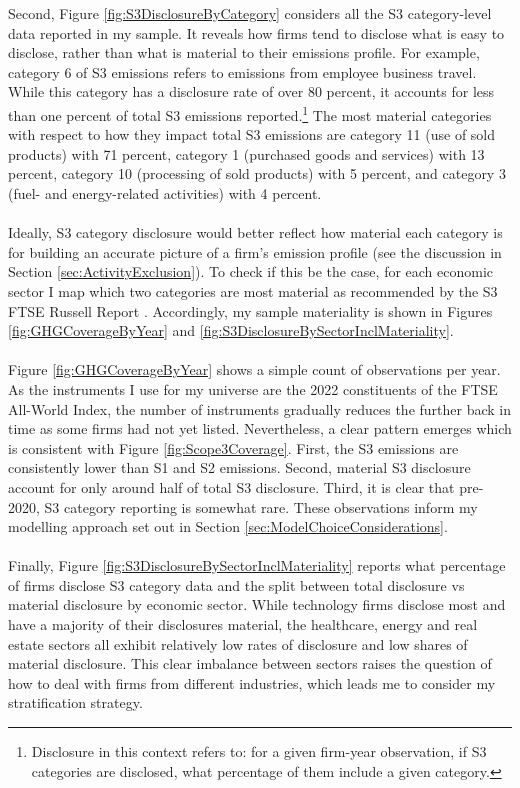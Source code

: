 \documentclass[12pt,twoside]{report}
\begin{document}
Second, Figure \ref{fig:S3DisclosureByCategory} considers all the S3 category-level data reported in my sample. It reveals how firms tend to disclose what is easy to disclose, rather than what is material to their emissions profile. For example, category 6 of S3 emissions refers to emissions from employee business travel. While this category has a disclosure rate of over 80 percent, it accounts for less than one percent of total S3 emissions reported.\footnote{Disclosure in this context refers to: for a given firm-year observation, if S3 categories are disclosed, what percentage of them include a given category.} The most material categories with respect to how they impact total S3 emissions are category 11 (use of sold products) with 71 percent, category 1 (purchased goods and services) with 13 percent, category 10 (processing of sold products) with 5 percent, and category 3 (fuel- and energy-related activities) with 4 percent. 
\\\\
Ideally, S3 category disclosure would better reflect how material each category is for building an accurate picture of a firm's emission profile (see the discussion in Section \ref{sec:ActivityExclusion}). To check if this be the case, for each economic sector I map which two categories are most material as recommended by the S3 FTSE Russell Report \cite{ftserussell2024}. Accordingly, my sample materiality is shown in Figures \ref{fig:GHGCoverageByYear} and \ref{fig:S3DisclosureBySectorInclMateriality}. 
\\\\
Figure \ref{fig:GHGCoverageByYear} shows a simple count of observations per year. As the instruments I use for my universe are the 2022 constituents of the FTSE All-World Index, the number of instruments gradually reduces the further back in time as some firms had not yet listed. Nevertheless, a clear pattern emerges which is consistent with Figure \ref{fig:Scope3Coverage}. First, the S3 emissions are consistently lower than S1 and S2 emissions. Second, material S3 disclosure account for only around half of total S3 disclosure. Third, it is clear that pre-2020, S3 category reporting is somewhat rare. These observations inform my modelling approach set out in Section \ref{sec:ModelChoiceConsiderations}. 
\\\\
Finally, Figure \ref{fig:S3DisclosureBySectorInclMateriality} reports what percentage of firms disclose S3 category data and the split between total disclosure vs material disclosure by economic sector. While technology firms disclose most and have a majority of their disclosures material, the healthcare, energy and real estate sectors all exhibit relatively low rates of disclosure and low shares of material disclosure. This clear imbalance between sectors raises the question of how to deal with firms from different industries, which leads me to consider my stratification strategy. 
\end{document}
